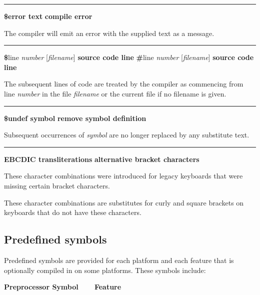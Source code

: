 \bigskip\hrule\vspace{0.1cm}
\noindent
{\bf \$error text } \hfill {\bf compile error}

\noindent
{}The compiler will emit an error with the
supplied text as a message.


\bigskip\hrule\vspace{0.1cm}
\noindent
{\textbf \$line \textit{number} [\textit{filename}] } \hfill {\bf source code line}
{\textbf \#line \textit{number} [\textit{filename}] } \hfill {\bf source code line}

\noindent
The subsequent lines of code are treated by the compiler as commencing
from line \textit{number} in the file \textit{filename} or the current
file if no filename is given.

\bigskip\hrule\vspace{0.1cm}
\noindent
{\bf \$undef symbol } \hfill {\bf remove symbol definition}

\noindent
{}Subsequent occurrences of \textit{symbol} are no longer
replaced by any substitute text.

\bigskip\hrule\vspace{0.1cm}
\noindent
{\bf EBCDIC transliterations } \hfill {\bf alternative bracket characters}

\noindent
These character combinations were introduced for legacy keyboards that
were missing certain bracket characters.


These character combinations are substitutes for curly and square
brackets on keyboards that do not have these characters.

\subsection*{Predefined symbols}

Predefined symbols are provided for each
platform and each feature that is optionally compiled in on some
platforms. These symbols include:

{\bfseries Preprocessor Symbol\ \ \ \ Feature}

